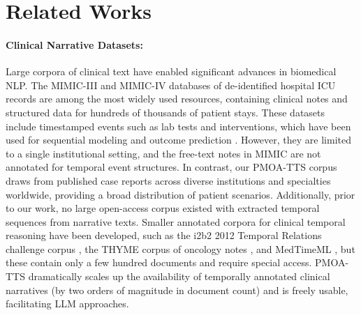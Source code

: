\newpage
\section{Related Works}
\label{apd:related_works}
\paragraph{Clinical Narrative Datasets:} 
Large corpora of clinical text have enabled significant advances in biomedical NLP.
The MIMIC-III \cite{johnson2016mimic} and MIMIC-IV \cite{johnson2023mimic} databases of de-identified hospital ICU records are among the most widely used resources, containing clinical notes and structured data for hundreds of thousands of patient stays.
These datasets include timestamped events such as lab tests and interventions, which have been used for sequential modeling and outcome prediction \cite{harutyunyan2019multitask, sheikhalishahi2020benchmarking}.
However, they are limited to a single institutional setting, and the free-text notes in MIMIC are not annotated for temporal event structures.
In contrast, our PMOA-TTS corpus draws from published case reports across diverse institutions and specialties worldwide, providing a broad distribution of patient scenarios.
Additionally, prior to our work, no large open-access corpus existed with extracted temporal sequences from narrative texts.
Smaller annotated corpora for clinical temporal reasoning have been developed, such as the i2b2 2012 Temporal Relations challenge corpus \cite{sun2013evaluating}, the THYME corpus of oncology notes \cite{styler2014temporal}, and MedTimeML \cite{reeves2013detection}, but these contain only a few hundred documents and require special access.
PMOA-TTS dramatically scales up the availability of temporally annotated clinical narratives (by two orders of magnitude in document count) and is freely usable, facilitating
LLM approaches.

